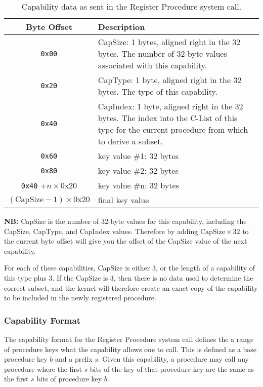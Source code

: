 \documentclass[english,a4paper]{article}
\let\oldparagraph\subsubsection
\renewcommand{\subsubsection}[1]{\oldparagraph{#1}\mbox{}}
\begin{document}
\begin{table}[H]
  \caption{Capability data as sent in the Register Procedure system call.\label{reg-cap-format}}
  \centering{}%
  \begin{tabularx}{\textwidth}{c|X}
    \hline
    Byte Offset & Description \\
    \hline
    \hline
    \texttt{0x00}       & CapSize: 1 bytes, aligned right in the 32 bytes. The
      number of 32-byte values associated with this capability. \\
    \texttt{0x20}       & CapType: 1 byte, aligned right in the 32 bytes. The
      type of this capability. \\
    \texttt{0x40}       & CapIndex: 1 byte, aligned right in the 32 bytes. The
      index into the C-List of this type for the current procedure from which to
      derive a subset. \\
    \texttt{0x60}       & key value \#1: 32 bytes \\
    \texttt{0x80}       & key value \#2: 32 bytes \\
    \texttt{0x40} $+ n \times 0\text{x}20$ & key value \#n: 32 bytes \\
    $\left(\text{CapSize} - 1\right) \times 0\text{x}20$  & final key value \\
    \hline
  \end{tabularx}
\end{table}

\textbf{NB:} CapSize is the number of 32-byte values for this capability,
including the CapSize, CapType, and CapIndex values. Therefore by adding
$\text{CapSize} \times 32$ to the current byte offset will give you the offset
of the CapSize value of the next capability.

For each of these capabilities, CapSize is either 3, or the length of a
capability of this type plus 3. If the CapSize is 3, then there is no data used
to determine the correct subset, and the kernel will therefore create an exact
copy of the capability to be included in the newly registered procedure.

\subsubsection{Capability Format}
The capability format for the Register Procedure system call defines the a range
of procedure keys what the capability allows one to call. This is defined as a
base procedure key $b$ and a prefix $s$. Given this capability, a procedure may
call any procedure where the first $s$ bits of the key of that procedure key are
the same as the first $s$ bits of procedure key $b$.
\end{document}

